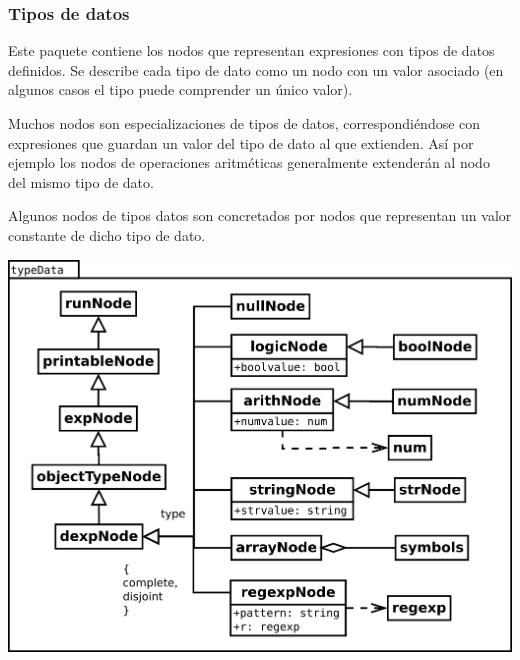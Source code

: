 \subsubsection{Tipos de datos}
Este paquete contiene los nodos que representan expresiones con tipos de datos definidos.
Se describe cada tipo de dato como un nodo con un valor asociado (en algunos casos el tipo puede comprender un único valor).

Muchos nodos son especializaciones de tipos de datos, correspondiéndose con expresiones que 
guardan un valor del tipo de dato al que extienden. Así por ejemplo los nodos de operaciones aritméticas
generalmente extenderán al nodo del mismo tipo de dato. 

Algunos nodos de tipos datos son concretados por nodos que representan un valor constante de dicho tipo de dato.
 
\begin{center}
\includegraphics[scale=0.4]{typeData.png} \\
\end{center}
\pagebreak
